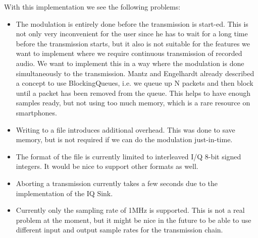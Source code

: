 \pagebreak
With this implementation we see the following problems: 
\begin{itemize}
	\item The modulation is entirely done before the transmission is start-ed. This is not only very inconvenient for the user since he has to wait for a long time before the transmission starts, but it also is not suitable for the features we want to implement where we require continuous transmission of recorded audio. We want to implement this in a way where the modulation is done simultaneously to the transmission. Mantz and Engelhardt \cite{Mantz2016} already described a concept to use BlockingQueues, i.e. we queue up N packets and then block until a packet has been removed from the queue. This helps to have enough samples ready, but not using too much memory, which is a rare resource on smartphones. 
	\item Writing to a file introduces additional overhead. This was done to save memory, but is not required if we can do the modulation just-in-time. 
	\item The format of the file is currently limited to interleaved I/Q 8-bit signed integers. It would be nice to support other formats as well. 
	\item Aborting a transmission currently takes a few seconds due to the implementation of the IQ Sink. 
	\item Currently only the sampling rate of 1MHz is supported. This is not a real problem at the moment, but it might be nice in the future to be able to use different input and output sample rates for the transmission chain.
\end{itemize}

\label{sec:impl:feature1}
